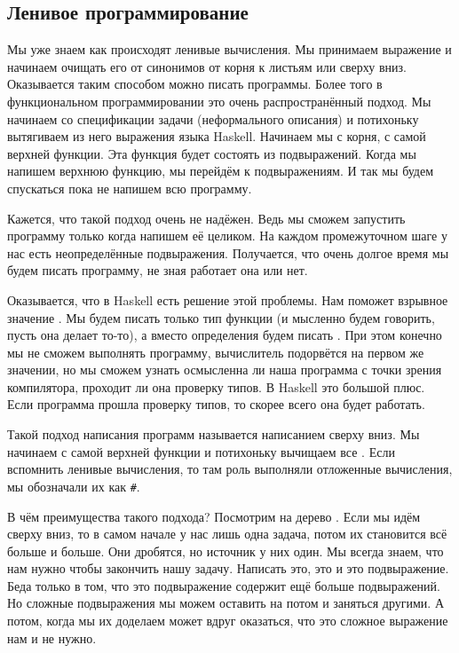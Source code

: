 \subsection{Ленивое программирование}

Мы уже знаем как происходят ленивые вычисления. Мы принимаем
выражение и начинаем очищать его от синонимов от корня к листьям
или сверху вниз. Оказывается таким способом можно писать программы.
Более того в функциональном программировании это очень
распространённый подход. Мы начинаем со спецификации задачи
(неформального описания) и потихоньку вытягиваем из него 
выражения языка Haskell. Начинаем мы с корня, с самой верхней
функции. Эта функция будет состоять из подвыражений. Когда
мы напишем верхнюю функцию, мы перейдём к подвыражениям. 
И так мы будем спускаться пока не напишем всю программу.

Кажется, что такой подход очень не надёжен. Ведь мы сможем
запустить программу только когда напишем её целиком.
На каждом промежуточном шаге у нас есть неопределённые подвыражения.
Получается, что очень долгое время мы будем писать программу,
не зная работает она или нет. 

Оказывается, что в Haskell есть решение этой проблемы. Нам 
поможет взрывное значение . Мы будем писать
только тип функции (и мысленно будем говорить, пусть она 
делает то-то), а вместо определения будем писать .
При этом конечно мы не сможем выполнять программу, вычислитель
подорвётся на первом же значении, но мы сможем узнать осмысленна
ли наша программа с точки зрения компилятора, проходит
ли она проверку типов. В Haskell это большой плюс. Если программа
прошла проверку типов, то скорее всего она будет работать.

Такой подход написания программ называется написанием
сверху вниз. Мы начинаем с самой верхней функции и потихоньку
вычищаем все . Если вспомнить ленивые вычисления,
то там роль  выполняли отложенные вычисления,
мы обозначали их как \verb!#!.

В чём преимущества такого подхода? Посмотрим на дерево 
.
Если мы идём сверху вниз, то в самом начале у нас лишь 
одна задача, потом их становится всё больше и больше.
Они дробятся, но источник у них один. Мы всегда знаем, что
нам нужно чтобы закончить нашу задачу. Написать это,
это и это подвыражение. Беда только в том, что это подвыражение
содержит ещё больше подвыражений. Но сложные подвыражения
мы можем оставить на потом и заняться другими. А потом, когда
мы их доделаем может вдруг оказаться, что это сложное выражение 
нам и не нужно. 

